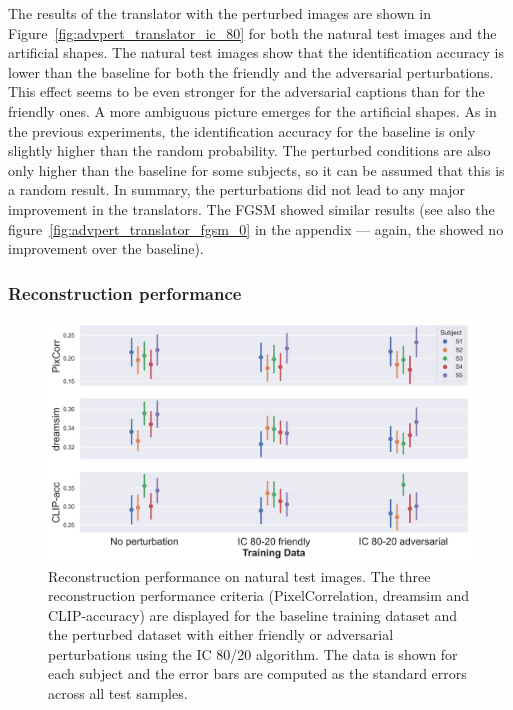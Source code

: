 The results of the translator with the perturbed images are shown in Figure~\ref{fig:advpert_translator_ic_80} for both the natural test images and the artificial shapes. The natural test images show that the identification accuracy is lower than the baseline for both the friendly and the adversarial perturbations. This effect seems to be even stronger for the adversarial captions than for the friendly ones. A more ambiguous picture emerges for the artificial shapes. As in the previous experiments, the identification accuracy for the baseline is only slightly higher than the random probability. The perturbed conditions are also only higher than the baseline for some subjects, so it can be assumed that this is a random result. In summary, the perturbations did not lead to any major improvement in the translators. The FGSM showed similar results (see also the figure~\ref{fig:advpert_translator_fgsm_0} in the appendix --- again, the  showed no improvement over the baseline). 


\subsubsection{Reconstruction performance}

\begin{figure}[ht]
    \centering
    \includegraphics[width=1\textwidth]{plots/advpert_reconstruction_test_ic_80-20.png}
    \caption[Experiment 3: Reconstruction performance on natural test images]{Reconstruction performance on natural test images. The three reconstruction performance criteria (PixelCorrelation, dreamsim and CLIP-accuracy) are displayed for the baseline training dataset and the perturbed dataset with either friendly or adversarial perturbations using the IC 80/20 algorithm. The data is shown for each subject and the error bars are computed as the standard errors across all test samples.}\label{fig:advpert_reconstruction_test_ic_80}
\end{figure}

